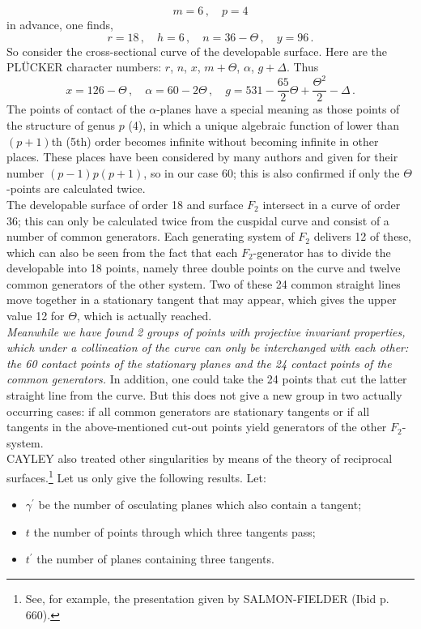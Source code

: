 \documentclass[leqno]{article}
\begin{document}
\[
m=6 \, , \quad p=4
\]
in advance, one finds,
\[
r = 18 \, , \quad h = 6 \, , \quad n = 36-\Theta \, , \quad y = 96 \, .
\]
So consider the cross-sectional curve of the developable surface. Here are the PL\"UCKER character numbers: $r$, $n$, $x$, $m+\Theta$, $\alpha$, $g+\Delta$. Thus 
\[
x = 126-\Theta \, , \quad \alpha=60-2\Theta \, , \quad g = 531-\frac{65}{2}\Theta + \frac{\Theta^2}{2} - \Delta \, . 
\]
The points of contact of the $ \alpha$-planes have a special meaning as those points of the structure of genus $p$ (4), in which a unique algebraic function of lower than $(p + 1)$th (5th) order becomes infinite without becoming infinite in other places. These places have been considered by many authors and given for their number $ (p-1) p (p + 1) $, so in our case 60; this is also confirmed if only the $ \Theta$-points are calculated twice. \\
The developable surface of order 18 and surface $ F_2 $ intersect in a curve of order 36; this can only be calculated twice from the cuspidal curve and consist of a number of common generators. Each generating system of $ F_2 $ delivers 12 of these, which can also be seen from the fact that each $ F_2$-generator has to divide the developable into 18 points, namely three double points on the curve and twelve common generators of the other system. Two of these 24 common straight lines move together in a stationary tangent that may appear, which gives the upper value 12 for $ \Theta $, which is actually reached. \\
\textit{Meanwhile we have found 2 groups of points with projective invariant properties, which under a collineation of the curve can only be interchanged with each other: the 60 contact points of the stationary planes and the 24 contact points of the common generators.} In addition, one could take the 24 points that cut the latter straight line from the curve. But this does not give a new group in two actually occurring cases: if all common generators are stationary tangents or if all tangents in the above-mentioned cut-out points yield generators of the other $F_2$-system. \\
CAYLEY also treated other singularities by means of the theory of reciprocal surfaces.\footnote{See, for example, the presentation given by SALMON-FIELDER (Ibid p. 660).} Let us only give the following results. Let:
\begin{itemize}[label={}]
	\item $ \gamma^\prime $ be the number of osculating planes which also contain a tangent;
	\item $ t $ the number of points through which three tangents pass;
	\item $ t^\prime $ the number of planes containing three tangents.
\end{itemize}
\end{document}
